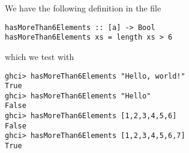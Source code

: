 
We have the following definition in the file 
\scriptsize\begin{verbatim}
hasMoreThan6Elements :: [a] -> Bool
hasMoreThan6Elements xs = length xs > 6
\end{verbatim}\normalsize
which we test with
\scriptsize\begin{verbatim}
ghci> hasMoreThan6Elements "Hello, world!"
True
ghci> hasMoreThan6Elements "Hello"
False
ghci> hasMoreThan6Elements [1,2,3,4,5,6]
False
ghci> hasMoreThan6Elements [1,2,3,4,5,6,7]
True
\end{verbatim}\normalsize

